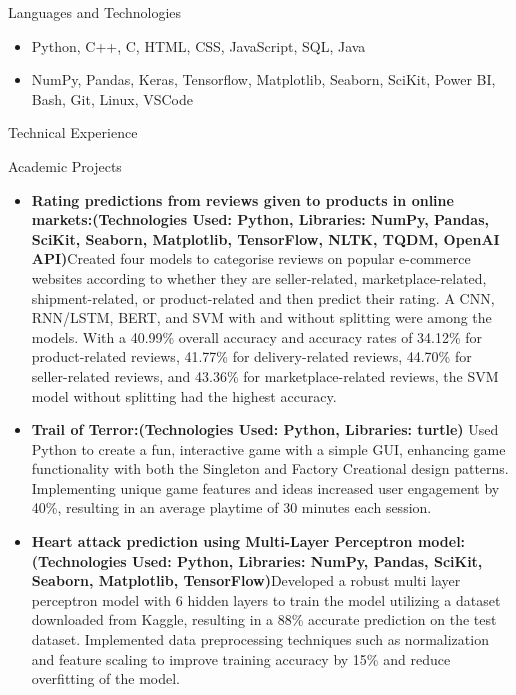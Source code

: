 \documentclass[]{mcdowellcv}
\begin{document}
\begin{cvsection}{Languages and Technologies}
		\begin{cvsubsection}{}{}{}	
			\begin{itemize}
				\item Python, C++, C, HTML, CSS, JavaScript, SQL, Java
				\item NumPy, Pandas, Keras, Tensorflow, Matplotlib, Seaborn, SciKit, Power BI, Bash, Git, Linux, VSCode
			\end{itemize}
		\end{cvsubsection}
	\end{cvsection}
	
	\begin{cvsection}{Technical Experience}
		\begin{cvsubsection}{Academic Projects}{}{}
			\begin{itemize}
				\item \textbf{Rating predictions from reviews given to products in online markets:\newline(Technologies Used: Python, Libraries: NumPy, Pandas, SciKit, Seaborn, Matplotlib, TensorFlow, NLTK, TQDM, OpenAI API)}\newline Created four models to categorise reviews on popular e-commerce websites according to whether they are seller-related, marketplace-related, shipment-related, or product-related and then predict their rating. A CNN, RNN/LSTM, BERT, and SVM with and without splitting were among the models. With a 40.99\% overall accuracy and accuracy rates of 34.12\% for product-related reviews, 41.77\% for delivery-related reviews, 44.70\% for seller-related reviews, and 43.36\% for marketplace-related reviews, the SVM model without splitting had the highest accuracy. 
				\item  \textbf{Trail of Terror:\newline(Technologies Used: Python, Libraries: turtle)}\newline
                Used Python to create a fun, interactive game with a simple GUI, enhancing game functionality with both the Singleton and Factory Creational design patterns. Implementing unique game features and ideas increased user engagement by 40\%, resulting in an average playtime of 30 minutes each session.
				\item  \textbf{Heart attack prediction using Multi-Layer Perceptron model:\newline(Technologies Used: Python, Libraries: NumPy, Pandas, SciKit, Seaborn, Matplotlib, TensorFlow)}\newline Developed a robust multi layer perceptron model with 6 hidden layers to train the model utilizing a dataset downloaded from Kaggle, resulting in a 88\% accurate prediction on the test dataset. Implemented data preprocessing techniques such as normalization and feature scaling to improve training accuracy by 15\% and reduce overfitting of the model.

\end{itemize}
\end{cvsubsection}
\end{cvsection}
\end{document}
